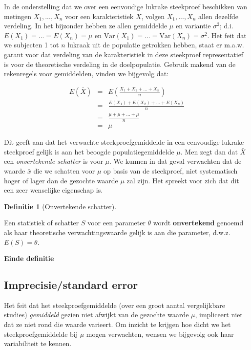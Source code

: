 \documentclass[
  12pt,dutch]{book}
\theoremstyle{definition}
\newtheorem{definition}{Definitie}[chapter]
\theoremstyle{definition}
\theoremstyle{definition}
\theoremstyle{definition}
\theoremstyle{remark}
\begin{document}
In de onderstelling dat we over een eenvoudige lukrake steekproef beschikken van metingen \(X_1,...,X_n\) voor een karakteristiek \(X\), volgen \(X_1,...,X_n\) allen dezelfde verdeling. In het
bijzonder hebben ze allen gemiddelde \(\mu\) en variantie \(\sigma^2\); d.i. \(E(X_1)=...=E(X_n)=\mu\) en \(\text{Var}(X_1)=...=\text{Var}(X_n)=\sigma^2\). Het feit
dat we subjecten 1 tot \(n\) lukraak uit de populatie getrokken hebben, staat
er m.a.w. garant voor dat verdeling van de karakteristiek in deze steekproef
representatief is voor de theoretische verdeling in de doelpopulatie.
Gebruik makend van de rekenregels voor gemiddelden, vinden we bijgevolg dat:

\begin{eqnarray*}
E(\bar X) &=& E \left(\frac{X_1+ X_2+ ... + X_n}{n}\right) \\
&= & \frac{E(X_1)+ E(X_2)+ ... + E(X_n)}{n} \\
&=& \frac{\mu + \mu + ... +\mu}{n} \\
&= & \mu
\end{eqnarray*}

Dit geeft aan dat het verwachte steekproefgemiddelde in een eenvoudige
lukrake steekproef gelijk is aan het beoogde populatiegemiddelde \(\mu\). Men
zegt dan dat \(\bar X\) een \emph{onvertekende schatter} is voor \(\mu\). We kunnen in
dat geval verwachten dat de waarde \(\bar x\) die we schatten voor \(\mu\) op
basis van de steekproef, niet systematisch hoger of lager dan de gezochte waarde \(\mu\) zal zijn. Het spreekt voor zich dat dit een zeer wenselijke eigenschap is.

\begin{definition}[Onvertekende schatter]
\protect\hypertarget{def:unnamed-chunk-128}{}\label{def:unnamed-chunk-128}~
\end{definition}

Een statistiek of schatter \(S\) voor een
parameter \(\theta\) wordt \textbf{onvertekend} genoemd als haar theoretische
verwachtingswaarde gelijk is aan die parameter, d.w.z. \(E(S)= \theta\).

\textbf{Einde definitie}

\subsection{Imprecisie/standard error}\label{imprecisiestandard-error}

Het feit dat het steekproefgemiddelde (over een groot aantal vergelijkbare studies) \emph{gemiddeld} gezien niet afwijkt van de gezochte waarde \(\mu\), impliceert niet dat ze niet rond die waarde varieert.
Om inzicht te krijgen hoe dicht we het steekproefgemiddelde bij \(\mu\) mogen verwachten, wensen we bijgevolg ook haar variabiliteit te kennen.
\end{document}
